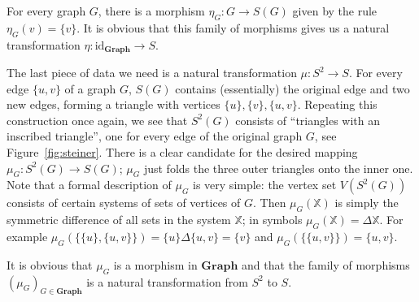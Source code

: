 \documentclass[reqno,A4paper]{amsart}
\newcommand{\id}{\mathrm{id}}
\newcommand{\Graph}{\mathbf{Graph}}
\theoremstyle{definition}
\numberwithin{equation}{section}
\begin{document}
For every graph $G$, there is a morphism $\eta_G:G\to S(G)$ given by the rule
$\eta_G(v)=\{v\}$. It is obvious that this family of morphisms gives us a natural
transformation $\eta:\id_\Graph\to S$.

The last piece of data we need is a natural transformation $\mu:S^2\to S$. For every
edge $\{u,v\}$ of a graph $G$, $S(G)$ contains (essentially) the original edge and two new
edges, forming a triangle with vertices $\{u\},\{v\},\{u,v\}$. Repeating this construction
once again, we see that $S^2(G)$ consists of ``triangles with an inscribed triangle'', one
for every edge of the original graph $G$, see Figure~\ref{fig:steiner}. There is a clear candidate for the desired
mapping $\mu_G:S^2(G)\to S(G)$; $\mu_G$ just folds the three outer triangles
onto the inner one. Note that a formal description of $\mu_G$ is very simple:
the vertex set $V(S^2(G))$ consists of certain systems of sets of vertices of $G$. Then
$\mu_G(\mathbb X)$ is simply the symmetric difference of all sets in the system 
$\mathbb X$; in symbols $\mu_G(\mathbb X)=\Delta\mathbb X$. For example
$\mu_G(\{\{u\},\{u,v\}\})=\{u\}\Delta\{u,v\}=\{v\}$ and $\mu_G(\{\{u,v\}\})=\{u,v\}$. 

It is obvious
that $\mu_G$ is a morphism in $\Graph$ and that the family of morphisms
$(\mu_G)_{G\in\Graph}$ is a natural transformation from $S^2$ to $S$.
\end{document}
